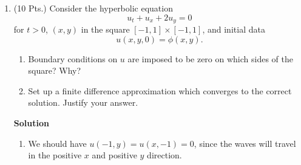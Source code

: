 \documentclass{article}
\begin{document}
\begin{enumerate}
\begin{enumerate}
\end{enumerate}



\item (10 Pts.) Consider the hyperbolic equation
\[u_t + u_x + 2u_y = 0\]
for \(t > 0\), \((x,y)\) in the square \([-1,1] \times [-1,1]\), and initial data
\[u(x,y,0) = \phi(x,y).\]

\begin{enumerate}
\item Boundary conditions on \(u\) are imposed to be zero on which sides of the square?  Why?

\item Set up a finite difference approximation which converges to the correct solution.  Justify your answer.

\end{enumerate}

{\bf Solution}

\begin{enumerate}
\item We should have \(u(-1,y) = u(x,-1) = 0\), since the waves will travel in the positive \(x\) and positive \(y\) direction.


\end{enumerate}
\end{enumerate}
\end{document}
